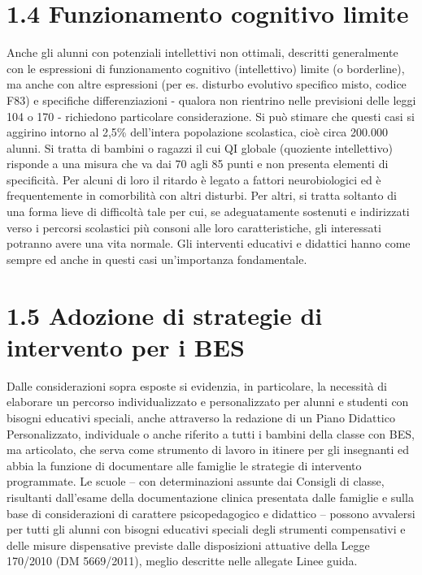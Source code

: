 \section*{1.4 Funzionamento cognitivo limite}
Anche gli alunni con potenziali intellettivi non ottimali, descritti generalmente con le espressioni di
funzionamento cognitivo (intellettivo) limite (o borderline), ma anche con altre espressioni (per es. disturbo
evolutivo specifico misto, codice F83) e specifiche differenziazioni - qualora non rientrino nelle previsioni
delle leggi 104 o 170 - richiedono particolare considerazione. Si può stimare che questi casi si aggirino
intorno al 2,5\% dell'intera popolazione scolastica, cioè circa 200.000 alunni.
Si tratta di bambini o ragazzi il cui QI globale (quoziente intellettivo) risponde a una misura che va dai 70
agli 85 punti e non presenta elementi di specificità. Per alcuni di loro il ritardo è legato a fattori
neurobiologici ed è frequentemente in comorbilità con altri disturbi. Per altri, si tratta soltanto di una forma
lieve di difficoltà tale per cui, se adeguatamente sostenuti e indirizzati verso i percorsi scolastici più consoni
alle loro caratteristiche, gli interessati potranno avere una vita normale. Gli interventi educativi e didattici
hanno come sempre ed anche in questi casi un'importanza fondamentale.
\section*{1.5 Adozione di strategie di intervento per i BES}
Dalle considerazioni sopra esposte si evidenzia, in particolare, la necessità di elaborare un percorso
individualizzato e personalizzato per alunni e studenti con bisogni educativi speciali, anche attraverso la
redazione di un Piano Didattico Personalizzato, individuale o anche riferito a tutti i bambini della classe con
BES, ma articolato, che serva come strumento di lavoro in itinere per gli insegnanti ed abbia la funzione di
documentare alle famiglie le strategie di intervento programmate.
Le scuole – con determinazioni assunte dai Consigli di classe, risultanti dall'esame della documentazione
clinica presentata dalle famiglie e sulla base di considerazioni di carattere psicopedagogico e didattico –
possono avvalersi per tutti gli alunni con bisogni educativi speciali degli strumenti compensativi e delle
misure dispensative previste dalle disposizioni attuative della Legge 170/2010 (DM 5669/2011), meglio
descritte nelle allegate Linee guida.
